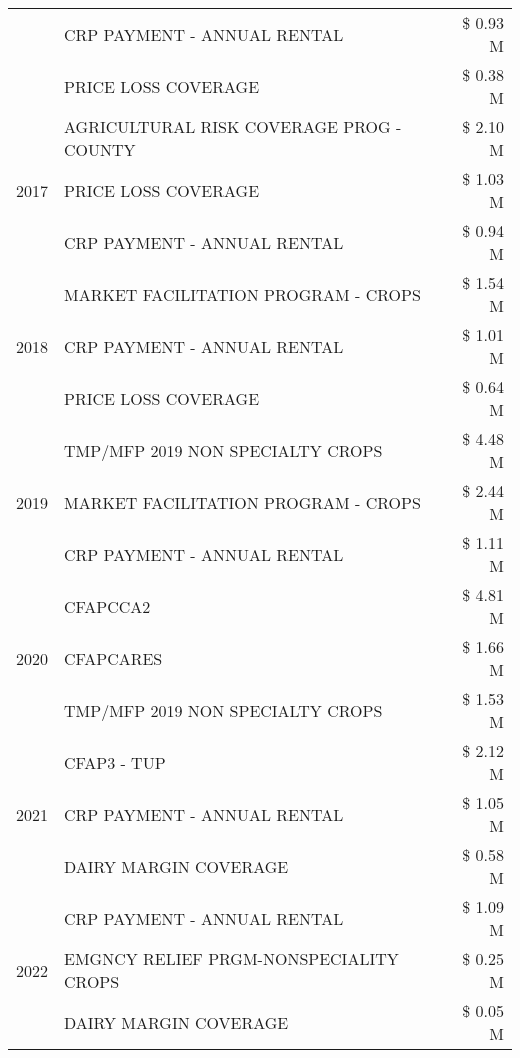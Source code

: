 \begin{tabular}{llr}
 & CRP PAYMENT - ANNUAL RENTAL & \$ 0.93 M \\
 & PRICE LOSS COVERAGE & \$ 0.38 M \\
\cline{1-3}
\multirow[t]{3}{*}{2017} & AGRICULTURAL RISK COVERAGE PROG - COUNTY & \$ 2.10 M \\
 & PRICE LOSS COVERAGE & \$ 1.03 M \\
 & CRP PAYMENT - ANNUAL RENTAL & \$ 0.94 M \\
\cline{1-3}
\multirow[t]{3}{*}{2018} & MARKET FACILITATION PROGRAM - CROPS & \$ 1.54 M \\
 & CRP PAYMENT - ANNUAL RENTAL & \$ 1.01 M \\
 & PRICE LOSS COVERAGE & \$ 0.64 M \\
\cline{1-3}
\multirow[t]{3}{*}{2019} & TMP/MFP 2019 NON SPECIALTY CROPS & \$ 4.48 M \\
 & MARKET FACILITATION PROGRAM - CROPS & \$ 2.44 M \\
 & CRP PAYMENT - ANNUAL RENTAL & \$ 1.11 M \\
\cline{1-3}
\multirow[t]{3}{*}{2020} & CFAPCCA2 & \$ 4.81 M \\
 & CFAPCARES & \$ 1.66 M \\
 & TMP/MFP 2019 NON SPECIALTY CROPS & \$ 1.53 M \\
\cline{1-3}
\multirow[t]{3}{*}{2021} & CFAP3 - TUP & \$ 2.12 M \\
 & CRP PAYMENT - ANNUAL RENTAL & \$ 1.05 M \\
 & DAIRY MARGIN COVERAGE & \$ 0.58 M \\
\cline{1-3}
\multirow[t]{3}{*}{2022} & CRP PAYMENT - ANNUAL RENTAL & \$ 1.09 M \\
 & EMGNCY RELIEF PRGM-NONSPECIALITY CROPS & \$ 0.25 M \\
 & DAIRY MARGIN COVERAGE & \$ 0.05 M \\
\cline{1-3}
\bottomrule
\end{tabular}
